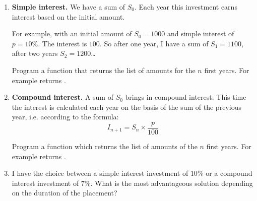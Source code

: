 \documentclass[11pt,class=report,crop=false]{standalone}
\begin{document}
\begin{activite}


\begin{enumerate}
  \item \textbf{Simple interest.} We have a sum of $S_0$. Each year this investment earns interest based on the initial amount. 
 
  For example, with an initial amount of $S_0 = 1000$ and simple interest of $p = 10 \%$. The interest is $100$. So after one year, I have a sum of $S_1=1100$, after two years $S_2 = 1200$\ldots
  
  Program a  function that returns the list of amounts for the $n$ first years. For example  returns 
  \ci{[1000, 1100, 1200, 1300]}.
  
  
  
  \item \textbf{Compound interest.} A sum of $S_0$ brings in compound interest. This time the interest is calculated each year on the basis of the sum of the previous year, i.e. according to the formula: 
  $$I_{n+1} = S_n \times \frac {p}{100}$$
  
    Program a function  which returns the list of amounts of the $n$ first years. For example  returns 
  \ci{[1000, 1100, 1210, 1331]}.
  
  
  \item I have the choice between a simple interest investment of $10\%$ or a compound interest investment of $7\%$.  What is the most advantageous solution depending on the duration of the placement? 
  
\end{enumerate}

\end{activite}

\end{document}
